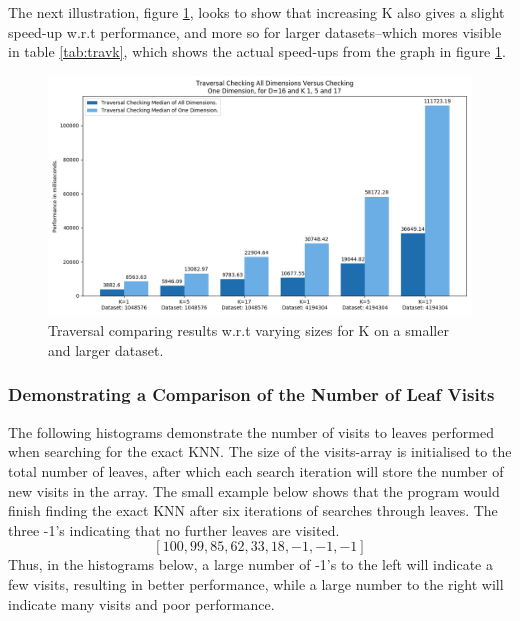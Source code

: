 The next illustration, figure \ref{fig:trav2}, looks to show that increasing K also gives a slight speed-up w.r.t performance, and more so for larger datasets--which mores visible in table \ref{tab:travk}, which shows the actual speed-ups from the graph in figure \ref{fig:trav2}.




\begin{figure}[H]
\centering
\includegraphics[width=1\textwidth]{pics/plot-figs/trav-d16.png}
\caption{Traversal comparing results w.r.t varying sizes for K on a smaller and larger dataset.}
\label{fig:trav2}
\end{figure}


\subsubsection{Demonstrating a Comparison of the Number of Leaf Visits}

The following histograms demonstrate the number of visits to leaves performed when searching for the exact KNN. The size of the visits-array is initialised to the total number of leaves,  after which each search iteration will store the number of new visits in the array. The small example below shows that the program would finish finding the exact KNN after six iterations of searches through leaves. The three -1’s indicating that no further leaves are visited. 
$$[100, 99, 85, 62, 33, 18, -1, -1, -1]$$
Thus, in the histograms below, a large number of -1's to the left will indicate a few visits, resulting in better performance, while a large number to the right will indicate many visits and poor performance.  


